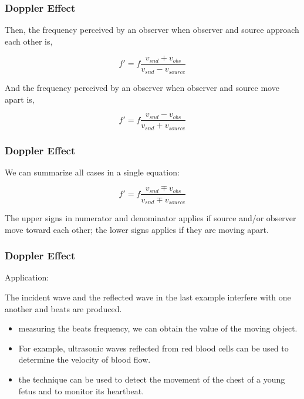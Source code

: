 \documentclass[]{beamer}
\begin{document}

\begin{frame}
\frametitle{Doppler Effect}

Then, the frequency perceived by an observer when observer and source approach each other is,

\begin{equation}
f'=f \frac{v_{snd}+v_{obs}}{v_{snd}-v_{source}}
\end{equation}

\pause

And the frequency perceived  by an observer when observer and source move apart is,

\begin{equation}
f'=f \frac{v_{snd}-v_{obs}}{v_{snd}+v_{source}}
\end{equation}


  \end{frame}


\begin{frame}
\frametitle{Doppler Effect}

We can summarize all cases in a single equation:

\begin{equation}
f'=f \frac{v_{snd}\mp  v_{obs}}{v_{snd}\mp v_{source}}
\end{equation}

\pause
\vspace{5mm}
                                                       
The upper signs in numerator and denominator applies if
source and/or observer move toward each other; the lower signs applies if they are
moving apart.

  \end{frame}


\begin{frame}
\frametitle{Doppler Effect}

Application:
\pause

\vspace{3mm}


The incident wave and the reflected wave in the last example interfere with one another and beats are produced.
\pause

\begin{itemize}
\item measuring the beats frequency, we can obtain the value of the moving object.
\pause
\item  For example, ultrasonic waves
reflected from red blood cells can be used to determine the velocity of blood flow.
\pause
\item the technique can be used to detect the movement of the chest of a
young fetus and to monitor its heartbeat.
\end{itemize}


  \end{frame}
\end{document}
